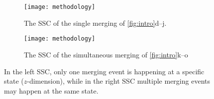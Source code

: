 \documentclass[twocolumn]{svjour3}          %
\begin{document}
\begin{figure*}
\centering
\begin{subfigure}[t]{0.48\textwidth}
\centering
\texttt{[image: methodology]}
\caption{The SSC of the single merging of \figs\ref{fig:intro}d--j.}
\end{subfigure}
\hfill
\begin{subfigure}[t]{0.48\textwidth}
\centering
\texttt{[image: methodology]}
\caption{The SSC of the simultaneous merging of \figs\ref{fig:intro}k--o}
\end{subfigure}
\caption{
In the left SSC, only one merging event is happening 
at a specific state ($z$-dimension), 
while in the right SSC multiple merging events may happen at the same state.
}
\label{fig:ssc}
\end{figure*}


%
%

\end{document}
